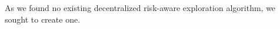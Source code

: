As we found no existing decentralized risk-aware exploration algorithm, we sought to create one.




